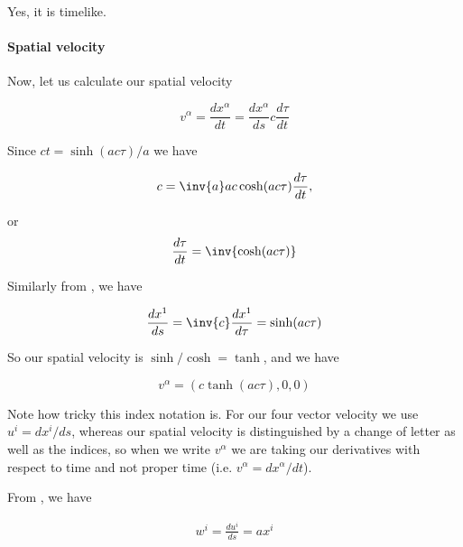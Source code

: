 {Yes, it is timelike.

\paragraph{Spatial velocity}

Now, let us calculate our spatial velocity

\begin{equation}\label{eqn:relativisticElectrodynamicsT2:100}
v^\alpha
= \frac{dx^\alpha}{dt}
=
\frac{dx^\alpha}{ds} c \frac{d\tau}{dt}
\end{equation}

Since $ct = \sinh( a c \tau )/a$ we have

\begin{equation}\label{eqn:relativisticElectrodynamicsT2:110}
c = \inv{a} a c \cosh( a c \tau ) \frac{d\tau}{dt},
\end{equation}

or
\begin{equation}\label{eqn:relativisticElectrodynamicsT2:110b}
\frac{d\tau}{dt} = \inv{\cosh( a c \tau) }
\end{equation}

Similarly from , we have

\begin{equation}\label{eqn:relativisticElectrodynamicsT2:120}
\frac{dx^1}{ds} = \inv{c} \frac{dx^1}{d\tau} = \sinh( a c \tau )
\end{equation}

So our spatial velocity is $\sinh/\cosh = \tanh$, and we have

\begin{equation}\label{eqn:relativisticElectrodynamicsT2:130}
v^\alpha = (c \tanh( a c \tau), 0, 0)
\end{equation}

Note how tricky this index notation is.  For our four vector velocity we use $u^i = dx^i/ds$, whereas our spatial velocity is distinguished by a change of letter as well as the indices, so when we write $v^\alpha$ we are taking our derivatives with respect to time and not proper time (i.e. $v^\alpha = dx^\alpha/dt$).



From , we have

\begin{equation}\label{eqn:relativisticElectrodynamicsT2:2160}
\begin{aligned}
w^i = \frac{ du^i }{ds} = a x^i
\end{aligned}
\end{equation}

}
